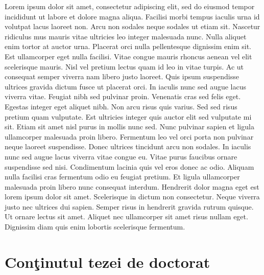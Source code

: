 Lorem ipsum dolor sit amet, consectetur adipiscing elit, sed do eiusmod tempor incididunt ut labore et dolore magna aliqua. Facilisi morbi tempus iaculis urna id volutpat lacus laoreet non. Arcu non sodales neque sodales ut etiam sit. Nascetur ridiculus mus mauris vitae ultricies leo integer malesuada nunc. Nulla aliquet enim tortor at auctor urna. Placerat orci nulla pellentesque dignissim enim sit. Est ullamcorper eget nulla facilisi. Vitae congue mauris rhoncus aenean vel elit scelerisque mauris. Nisl vel pretium lectus quam id leo in vitae turpis. Ac ut consequat semper viverra nam libero justo laoreet. Quis ipsum suspendisse ultrices gravida dictum fusce ut placerat orci. In iaculis nunc sed augue lacus viverra vitae. Feugiat nibh sed pulvinar proin. Venenatis cras sed felis eget. Egestas integer eget aliquet nibh. Non arcu risus quis varius. Sed sed risus pretium quam vulputate.
Est ultricies integer quis auctor elit sed vulputate mi sit. Etiam sit amet nisl purus in mollis nunc sed. Nunc pulvinar sapien et ligula ullamcorper malesuada proin libero. Fermentum leo vel orci porta non pulvinar neque laoreet suspendisse. Donec ultrices tincidunt arcu non sodales. In iaculis nunc sed augue lacus viverra vitae congue eu. Vitae purus faucibus ornare suspendisse sed nisi. Condimentum lacinia quis vel eros donec ac odio. Aliquam nulla facilisi cras fermentum odio eu feugiat pretium. Et ligula ullamcorper malesuada proin libero nunc consequat interdum. Hendrerit dolor magna eget est lorem ipsum dolor sit amet. Scelerisque in dictum non consectetur. Neque viverra justo nec ultrices dui sapien. Semper risus in hendrerit gravida rutrum quisque. Ut ornare lectus sit amet. Aliquet nec ullamcorper sit amet risus nullam eget. Dignissim diam quis enim lobortis scelerisque fermentum.


\section{Con\c{t}inutul tezei de doctorat}  %
\label{section1.3}

